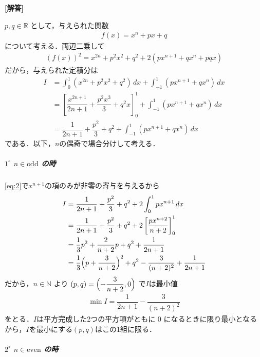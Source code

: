 \documentclass[../../main.tex]{subfiles}
\begin{document}
\begin{oframed}
  
\end{oframed}

{\bf [解答]}

$p,q \in \mathbb{R}$ として，与えられた関数
\begin{align}
  f(x) = x^n + px + q \label{eq:1}
\end{align}
について考える．両辺二乗して
\begin{align}
  (f(x))^2 = x^{2n} + p^2 x^2 + q^2 + 2(p x^{n+1} + q x^n + pq x)
\end{align}
だから，与えられた定積分は
\begin{align}
  I
  & = \int_0^1 (x^{2n} + p^2 x^2 + q^2) \, dx + \int_{-1}^1 (p x^{n+1} + q x^n) \, dx \\
  & = \left[\dfrac{x^{2n+1}}{2n+1} + \dfrac{p^2x^3}{3} + q^2 x\right]_{0}^{1} + \int_{-1}^1 (p x^{n+1} + q x^n) \, dx \\
  & = \dfrac{1}{2n+1} + \dfrac{p^2}{3} + q^2 + \int_{-1}^1 (p x^{n+1} + q x^n) \, dx \label{eq:2}
\end{align}
である．以下，$n$の偶奇で場合分けして考える．

\subparagraph{$1^\circ$ $n \in \text{odd}$ の時}

\cref{eq:2}で$x^{n+1}$の項のみが非零の寄与を与えるから
\begin{align}
  I
  &= \dfrac{1}{2n+1} + \dfrac{p^2}{3} + q^2 + 2 \int_0^1 p x^{n+1} \, dx \\
  &= \dfrac{1}{2n+1} + \dfrac{p^2}{3} + q^2 + 2 \left[\dfrac{px^{n+2}}{n+2}\right]_{0}^{1} \\
  &= \dfrac{1}{3} p^2 + \dfrac{2}{n+2} p + q^2 + \dfrac{1}{2n+1} \\
  &= \dfrac{1}{3} \Bigl( p + \dfrac{3}{n+2} \Bigr)^2 + q^2 - \dfrac{3}{(n+2)^2} + \dfrac{1}{2n+1}
\end{align}
だから，$n \in \mathbb{N}$ より $(p,q) = \Bigl(-\dfrac{3}{n+2}, 0\Bigr)$ で$I$は最小値
\begin{align}
  \min I = \dfrac{1}{2n+1} - \dfrac{3}{(n+2)^2} \label{eq:3}
\end{align}
をとる．$I$は平方完成した2つの平方項がともに $0$ になるときに限り最小となるから，$I$を最小にする$(p, q)$はこの1組に限る．

\subparagraph{$2^\circ$ $n \in \text{even}$ の時}
\end{document}
